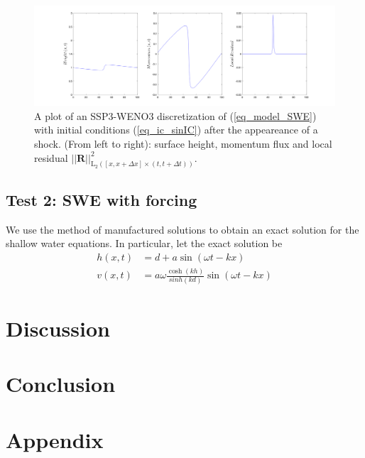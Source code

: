 \documentclass[12pt,a4paper]{article}
\numberwithin{equation}{section}
\theoremstyle{definition}
\newcommand{\Norm}[1]{\left|\left|#1\right|\right|}
\newcommand{\vect}[1]{\textbf{#1}}
\newcommand{\leb}{\text{L}}
\newcommand{\qp}[1]{\left(#1\right)}
\newcommand{\qb}[1]{\left[#1\right]}
\begin{document}
\begin{figure}[H]
	\centering
	\includegraphics[scale=0.45]{../figures/fig_SHW_RK3_WENO3_rec3_fixed_621_dtdx_1}	
	\caption{A plot of an SSP3-WENO3 discretization of (\ref{eq_model_SWE}) with initial conditions (\ref{eq_ic_sinIC}) after the appeareance of a shock. (From left to right): surface height, momentum flux and local residual $\Norm{\vect{R}}^2_{\leb_2\qp{\qb{x,x+\Delta x}\times\qp{t,t+\Delta t}}}$.}
	\label{fig_aftershock}
\end{figure}





\subsection{Test 2: SWE with forcing}
We use the method of manufactured solutions to obtain an exact solution for the shallow water equations.  In particular, let the exact solution be 
\begin{equation}
\begin{aligned}
h\qp{x,t}&= d+a\sin\qp{\omega t-kx}\\
v\qp{x,t}&=a\omega \frac{\cosh\qp{kh}}{sinh(kd)}\sin(\omega t-k x)
\end{aligned}
\end{equation}


\section{Discussion}\label{sec:discussion}

\section{Conclusion}\label{sec:conclusion}




\appendix
\section{Appendix}
\end{document}

